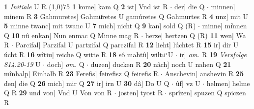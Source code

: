 \documentclass[8pt,a4paper,notitlepage]{article}
\begin{document}
\begin{table}[ht]
\begin{minipage}[t]{0.5\linewidth}
\textbf{1} \textit{Initiale} U R  \newline
\line(1,0){75} \newline
\textbf{1} kome] kam Q \textbf{2} ist] Vnd ist R  $\cdot$ der] die Q  $\cdot$ minnen] minem R \textbf{3} Gahmuretes] Gahmuͦretes U gamúretes Q Gahmurtes R \textbf{4} unz] mit U \textbf{5} minne twanc] mit twanc U \textbf{7} mich] nicht Q \textbf{9} kan] sold Q (R)  $\cdot$ minne] mi͑nnen Q \textbf{10} nû enkan] Nun enmac Q Minne mag R  $\cdot$ herze] hertzen Q (R) \textbf{11} wen] Wa R  $\cdot$ Parcifal] Parzifal U partzifal Q parczifal R \textbf{12} lieht] lúchtet R \textbf{15} ir] dir U úcht R \textbf{16} wîtiu] reiche Q witte R \textbf{18} sô mahtû] wiltuͦ U  $\cdot$ ir] \textit{om.} R \textbf{19} \textit{Versfolge 814.20-19} U   $\cdot$ doch] \textit{om.} Q  $\cdot$ duzen] ducken R \textbf{20} nâch] noch U nahen Q \textbf{21} mînhalp] Einhalb R \textbf{23} Ferefis] feirefisz Q feirefis R  $\cdot$ Anschevin] anshevin R \textbf{25} den] die Q \textbf{26} mich] mir Q \textbf{27} ir] irn U \textbf{30} dâ] Do U Q  $\cdot$ ûf] vz U  $\cdot$ helmen] helme Q R \textbf{29} und von] Vnd U Von von R  $\cdot$ josten] tyost R  $\cdot$ sprîzen] spuzen Q spiczen R \newline
\end{minipage}
\end{table}
\end{document}

